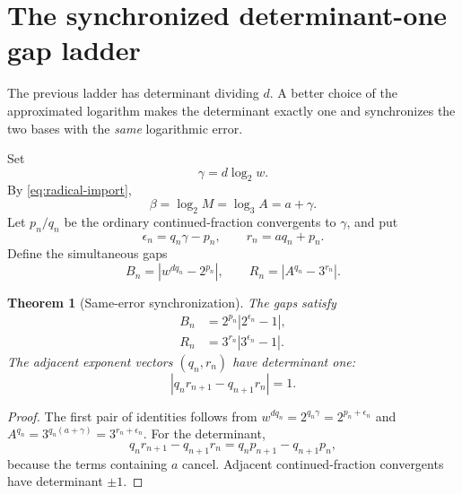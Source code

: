 \documentclass[11pt]{article}
\newtheorem{theorem}{Theorem}[section]
\theoremstyle{definition}
\begin{document}
\section{The synchronized determinant-one gap ladder}
\label{sec:gap-ladder}

The previous ladder has determinant dividing \(d\).  A better choice of the
approximated logarithm makes the determinant exactly one and synchronizes
the two bases with the \emph{same} logarithmic error.

Set
\begin{equation}\label{eq:gamma}
 \gamma=d\log_2w.
\end{equation}
By \cref{eq:radical-import},
\begin{equation}\label{eq:beta-gamma}
 \beta=\log_2M=\log_3A=a+\gamma.
\end{equation}
Let \(p_n/q_n\) be the ordinary continued-fraction convergents to
\(\gamma\), and put
\begin{equation}\label{eq:eps-r}
 \epsilon_n=q_n\gamma-p_n,
 \qquad r_n=aq_n+p_n.
\end{equation}
Define the simultaneous gaps
\begin{equation}\label{eq:BR-def}
 B_n=\left|w^{dq_n}-2^{p_n}\right|,
 \qquad
 R_n=\left|A^{q_n}-3^{r_n}\right|.
\end{equation}

\begin{theorem}[Same-error synchronization]\label{thm:same-error}
The gaps satisfy
\begin{align}
 B_n&=2^{p_n}\left|2^{\epsilon_n}-1\right|,
 \label{eq:B-same-error}\\
 R_n&=3^{r_n}\left|3^{\epsilon_n}-1\right|.
 \label{eq:R-same-error}
\end{align}
The adjacent exponent vectors \((q_n,r_n)\) have determinant one:
\begin{equation}\label{eq:det-one}
 |q_nr_{n+1}-q_{n+1}r_n|=1.
\end{equation}
\end{theorem}

\begin{proof}
The first pair of identities follows from
\(w^{dq_n}=2^{q_n\gamma}=2^{p_n+\epsilon_n}\) and
\(A^{q_n}=3^{q_n(a+\gamma)}=3^{r_n+\epsilon_n}\).  For the determinant,
\[
 q_nr_{n+1}-q_{n+1}r_n
 =q_np_{n+1}-q_{n+1}p_n,
\]
because the terms containing \(a\) cancel.  Adjacent continued-fraction
convergents have determinant \(\pm1\).
\end{proof}
\end{document}
